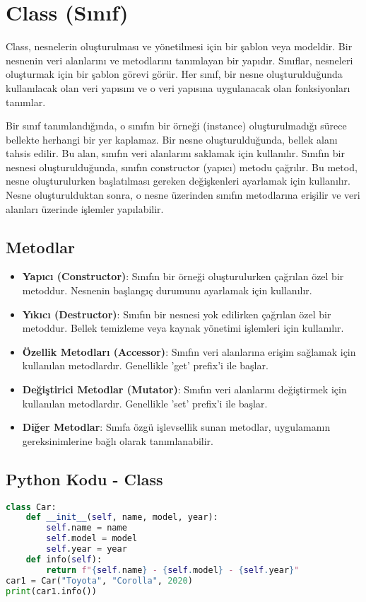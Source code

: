 \section{Class (Sınıf)}

Class, nesnelerin oluşturulması ve yönetilmesi için bir şablon veya modeldir. Bir nesnenin veri alanlarını ve metodlarını tanımlayan bir yapıdır. Sınıflar, nesneleri oluşturmak için bir şablon görevi görür. Her sınıf, bir nesne oluşturulduğunda kullanılacak olan veri yapısını ve o veri yapısına uygulanacak olan fonksiyonları tanımlar. 

Bir sınıf tanımlandığında, o sınıfın bir örneği (instance) oluşturulmadığı sürece bellekte herhangi bir yer kaplamaz. Bir nesne oluşturulduğunda, bellek alanı tahsis edilir. Bu alan, sınıfın veri alanlarını saklamak için kullanılır. Sınıfın bir nesnesi oluşturulduğunda, sınıfın constructor (yapıcı) metodu çağrılır. Bu metod, nesne oluşturulurken başlatılması gereken değişkenleri ayarlamak için kullanılır. Nesne oluşturulduktan sonra, o nesne üzerinden sınıfın metodlarına erişilir ve veri alanları üzerinde işlemler yapılabilir.

\subsection{Metodlar}

\begin{itemize}
    \item \textbf{Yapıcı (Constructor)}: Sınıfın bir örneği oluşturulurken çağrılan özel bir metoddur. Nesnenin başlangıç durumunu ayarlamak için kullanılır.
    \item \textbf{Yıkıcı (Destructor)}: Sınıfın bir nesnesi yok edilirken çağrılan özel bir metoddur. Bellek temizleme veya kaynak yönetimi işlemleri için kullanılır.
    \item \textbf{Özellik Metodları (Accessor)}: Sınıfın veri alanlarına erişim sağlamak için kullanılan metodlardır. Genellikle 'get' prefix'i ile başlar.
    \item \textbf{Değiştirici Metodlar (Mutator)}: Sınıfın veri alanlarını değiştirmek için kullanılan metodlardır. Genellikle 'set' prefix'i ile başlar.
    \item \textbf{Diğer Metodlar}: Sınıfa özgü işlevsellik sunan metodlar, uygulamanın gereksinimlerine bağlı olarak tanımlanabilir.
\end{itemize}

\subsection{Python Kodu - Class}

\begin{lstlisting}[language=Python]
class Car:
    def __init__(self, name, model, year):
        self.name = name
        self.model = model
        self.year = year
    def info(self):
        return f"{self.name} - {self.model} - {self.year}"
car1 = Car("Toyota", "Corolla", 2020)
print(car1.info())
\end{lstlisting}

\newpage